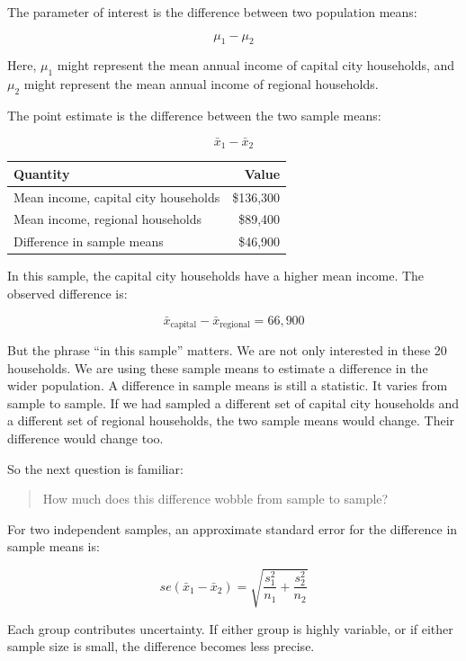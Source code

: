 \documentclass[
  letterpaper,
  DIV=11,
  numbers=noendperiod]{scrreprt}
\begin{document}
The parameter of interest is the difference between two population
means:

\[
\mu_1 - \mu_2
\]

Here, \(\mu_1\) might represent the mean annual income of capital city
households, and \(\mu_2\) might represent the mean annual income of
regional households.

The point estimate is the difference between the two sample means:

\[
\bar{x}_1 - \bar{x}_2
\]

\begin{table}
\fontsize{12.0pt}{14.0pt}\selectfont
\begin{tabular*}{\linewidth}{@{\extracolsep{\fill}}lr}
\toprule
Quantity & Value \\ 
\midrule\addlinespace[2.5pt]
Mean income, capital city households & \$136,300 \\ 
Mean income, regional households & \$89,400 \\ 
Difference in sample means & \$46,900 \\ 
\bottomrule
\end{tabular*}
\end{table}

In this sample, the capital city households have a higher mean income.
The observed difference is:

\[
\bar{x}_{\text{capital}}
-
\bar{x}_{\text{regional}}
=
66{,}900
\]

But the phrase ``in this sample'' matters. We are not only interested in
these 20 households. We are using these sample means to estimate a
difference in the wider population. A difference in sample means is
still a statistic. It varies from sample to sample. If we had sampled a
different set of capital city households and a different set of regional
households, the two sample means would change. Their difference would
change too.

So the next question is familiar:

\begin{quote}
How much does this difference wobble from sample to sample?
\end{quote}

For two independent samples, an approximate standard error for the
difference in sample means is:

\[
se(\bar{x}_1 - \bar{x}_2)
=
\sqrt{
\frac{s_1^2}{n_1}
+
\frac{s_2^2}{n_2}
}
\]

Each group contributes uncertainty. If either group is highly variable,
or if either sample size is small, the difference becomes less precise.
\end{document}
